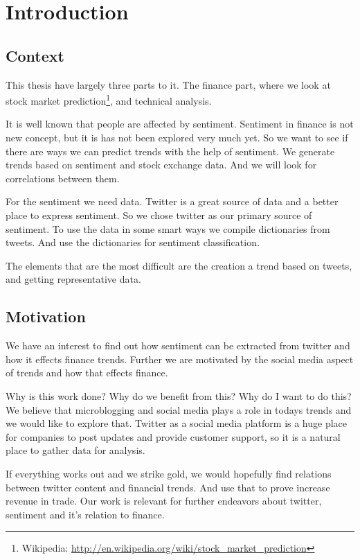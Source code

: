 \chapter{Introduction}\label{introduction}

\section{Context}
This thesis have largely three parts to it. The finance part, where we look at
stock market prediction\footnote{Wikipedia:
\url{http://en.wikipedia.org/wiki/stock_market_prediction}}, and technical
analysis.  

It is well known that people are affected by sentiment. Sentiment in finance is
not new concept, but it is has not been explored very much yet. So we want to
see if there are ways we can predict trends with the help of sentiment. We
generate trends based on sentiment and stock exchange data. And we will look for
correlations between them. 

For the sentiment we need data. Twitter is a great source of data and a better
place to express sentiment. So we chose twitter as our primary source of
sentiment. To use the data in some smart ways we compile dictionaries from
tweets. And use the dictionaries for sentiment classification. 

The elements that are the most difficult are the creation a trend based on
tweets, and getting representative data. 
%

\section{Motivation}
We have an interest to find out how sentiment can be extracted from twitter and
how it effects finance trends. Further we are motivated by the social media
aspect of trends and how that effects finance. 

Why is this work done? Why do we benefit from this? Why do I want to do this?
We believe that microblogging and social media plays a role in todays trends
and we would like to explore that. Twitter as a social media platform is a huge
place for companies to post updates and provide customer support, so it is a
natural place to gather data for analysis. 

If everything works out and we strike gold, we would hopefully find relations
between twitter content and financial trends. And use that to prove increase
revenue in trade. Our work is relevant for further endeavors about twitter,
sentiment and it's relation to finance. 

